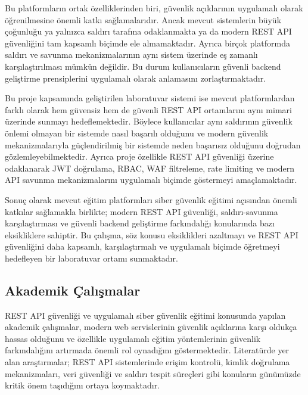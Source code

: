 Bu platformların ortak özelliklerinden biri, güvenlik açıklarının uygulamalı olarak öğrenilmesine önemli katkı sağlamalarıdır. Ancak mevcut sistemlerin büyük çoğunluğu ya yalnızca saldırı tarafına odaklanmakta ya da modern REST API güvenliğini tam kapsamlı biçimde ele almamaktadır. Ayrıca birçok platformda saldırı ve savunma mekanizmalarının aynı sistem üzerinde eş zamanlı karşılaştırılması mümkün değildir. Bu durum kullanıcıların güvenli backend geliştirme prensiplerini uygulamalı olarak anlamasını zorlaştırmaktadır.

Bu proje kapsamında geliştirilen laboratuvar sistemi ise mevcut platformlardan farklı olarak hem güvensiz hem de güvenli REST API ortamlarını aynı mimari üzerinde sunmayı hedeflemektedir. Böylece kullanıcılar aynı saldırının güvenlik önlemi olmayan bir sistemde nasıl başarılı olduğunu ve modern güvenlik mekanizmalarıyla güçlendirilmiş bir sistemde neden başarısız olduğunu doğrudan gözlemleyebilmektedir. Ayrıca proje özellikle REST API güvenliği üzerine odaklanarak JWT doğrulama, RBAC, WAF filtreleme, rate limiting ve modern API savunma mekanizmalarını uygulamalı biçimde göstermeyi amaçlamaktadır.

Sonuç olarak mevcut eğitim platformları siber güvenlik eğitimi açısından önemli katkılar sağlamakla birlikte; modern REST API güvenliği, saldırı-savunma karşılaştırması ve güvenli backend geliştirme farkındalığı konularında bazı eksikliklere sahiptir. Bu çalışma, söz konusu eksiklikleri azaltmayı ve REST API güvenliğini daha kapsamlı, karşılaştırmalı ve uygulamalı biçimde öğretmeyi hedefleyen bir laboratuvar ortamı sunmaktadır.

\subsection{Akademik Çalışmalar}
\label{akademik-al-malar}

REST API güvenliği ve uygulamalı siber güvenlik eğitimi konusunda yapılan akademik çalışmalar, modern web servislerinin güvenlik açıklarına karşı oldukça hassas olduğunu ve özellikle uygulamalı eğitim yöntemlerinin güvenlik farkındalığını artırmada önemli rol oynadığını göstermektedir. Literatürde yer alan araştırmalar; REST API sistemlerinde erişim kontrolü, kimlik doğrulama mekanizmaları, veri güvenliği ve saldırı tespit süreçleri gibi konuların günümüzde kritik önem taşıdığını ortaya koymaktadır.

